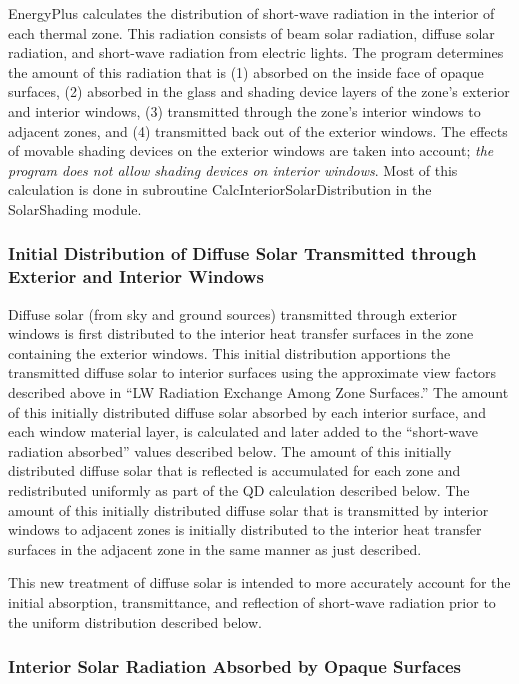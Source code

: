 EnergyPlus calculates the distribution of short-wave radiation in the interior of each thermal zone. This radiation consists of beam solar radiation, diffuse solar radiation, and short-wave radiation from electric lights. The program determines the amount of this radiation that is (1) absorbed on the inside face of opaque surfaces, (2) absorbed in the glass and shading device layers of the zone's exterior and interior windows, (3) transmitted through the zone's interior windows to adjacent zones, and (4) transmitted back out of the exterior windows. The effects of movable shading devices on the exterior windows are taken into account; \emph{the program does not allow shading devices on interior windows}. Most of this calculation is done in subroutine CalcInteriorSolarDistribution in the SolarShading module.

\subsubsection{Initial Distribution of Diffuse Solar Transmitted through Exterior and Interior Windows}\label{initial-distribution-of-diffuse-solar-transmitted-through-exterior-and-interior-windows}

Diffuse solar (from sky and ground sources) transmitted through exterior windows is first distributed to the interior heat transfer surfaces in the zone containing the exterior windows. This initial distribution apportions the transmitted diffuse solar to interior surfaces using the approximate view factors described above in ``LW Radiation Exchange Among Zone Surfaces.'' The amount of this initially distributed diffuse solar absorbed by each interior surface, and each window material layer, is calculated and later added to the ``short-wave radiation absorbed'' values described below. The amount of this initially distributed diffuse solar that is reflected is accumulated for each zone and redistributed uniformly as part of the QD calculation described below. The amount of this initially distributed diffuse solar that is transmitted by interior windows to adjacent zones is initially distributed to the interior heat transfer surfaces in the adjacent zone in the same manner as just described.

This new treatment of diffuse solar is intended to more accurately account for the initial absorption, transmittance, and reflection of short-wave radiation prior to the uniform distribution described below.

\subsubsection{Interior Solar Radiation Absorbed by Opaque Surfaces}\label{interior-solar-radiation-absorbed-by-opaque-surfaces}


